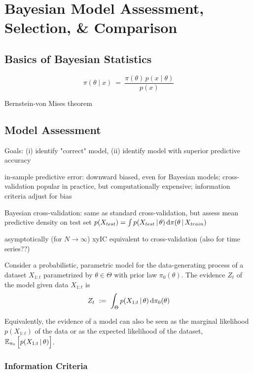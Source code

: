 \chapter{Bayesian Model Assessment, Selection, \& Comparison}

\section{Basics of Bayesian Statistics}

\begin{equation*}
\pi(\theta \mid x) ~ = ~ \frac{ \pi(\theta) \, p(x \mid \theta) }{ p(x) }
\end{equation*}

Bernstein-von Mises theorem


\section{Model Assessment}

Goals: (i) identify "correct" model, (ii) identify model with superior predictive accuracy

in-sample predictive error: downward biased, even for Bayesian models; cross-validation popular in practice, but computationally expensive; information criteria adjust for bias

Bayesian cross-validation: same as standard cross-validation, but assess mean predictive density on test set $p(X_{test}) = \int p(X_{test} \,|\, \theta) \, \textrm{d} \pi(\theta \,|\, X_{train})$

asymptotically (for $N \to \infty$) xyIC equivalent to cross-validation (also for time series??)

\begin{definition}[Evidence]
Consider a probabilistic, parametric model for the data-generating process of a dataset $X_{1:t}$ parametrized by $\theta \in \Theta$ with prior law $\pi_0(\theta)$. The evidence $Z_t$ of the model given data $X_{1:t}$ is
\begin{equation*}
Z_t ~ := ~ \int_\Theta p(X_{1:t} \,|\, \theta) \, \textrm{d} \pi_0(\theta)
\end{equation*}
\end{definition}
Equivalently, the evidence of a model can also be seen as the marginal likelihood $p(X_{1:t})$ of the data or as the expected likelihood of the dataset, $\operatorname{\mathbb{E}}_{\pi_0} \Big[ p(X_{1:t} \,|\, \theta) \Big]$.

\subsection{Information Criteria}

